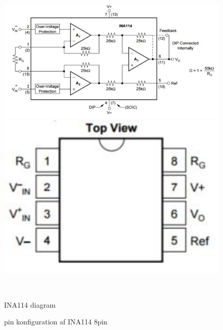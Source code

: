  \begin{figure}[htbp] \centering
\begin{minipage}[b]{0.48\textwidth} \centering
\includegraphics[width=1.00\textwidth]{billeder/Hardware/INA114diagram.JPG} %
\end{minipage} \hfill
\begin{minipage}[b]{0.48\textwidth} \centering
\includegraphics[width=1.00\textwidth]{billeder/Hardware/pinkonfig.JPG} %
\end{minipage} \\ %
\begin{minipage}[t]{0.48\textwidth}
\caption{INA114 diagram} %
\label{fig:INA114diagram}
\end{minipage} \hfill
\begin{minipage}[t]{0.48\textwidth}
\caption{pin konfiguration af INA114 8pin } %
\label{fig:INA114Pin}
\end{minipage}
\end{figure}
